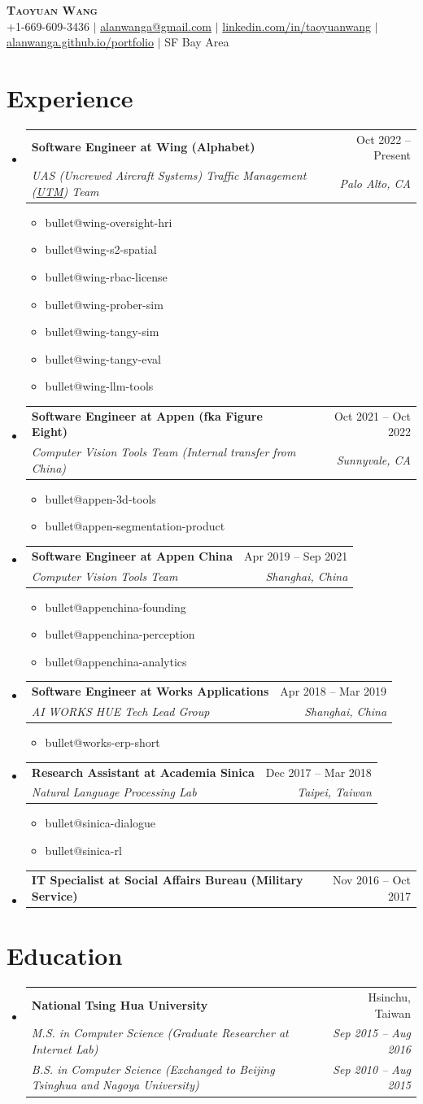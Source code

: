 \documentclass[letterpaper,11pt]{article}
\makeatletter
\newcommand{\resumeItem}[1]{\item\small{{#1 \vspace{-2pt}}}}
\newcommand{\resumeSubheading}[4]{
  \vspace{-2pt}\item
    \begin{tabular*}{\linewidth}[t]{l@{\extracolsep{\fill}}r}
      \textbf{#1} & #2 \\
      \textit{\small#3} & \textit{\small #4} \\
    \end{tabular*}\vspace{-7pt}
}
\newcommand{\resumeSingleHeading}[2]{
  \vspace{-2pt}\item
    \begin{tabular*}{\linewidth}[t]{l@{\extracolsep{\fill}}r}
      \textbf{#1} & #2 \\
    \end{tabular*}\vspace{-7pt}
}
\newcommand{\resumeEducation}[6]{
  \vspace{-2pt}\item
    \begin{tabular*}{\linewidth}[t]{l@{\extracolsep{\fill}}r}
      \textbf{#1} & #2 \\
      \textit{\small#3} & \textit{\small #4} \\
      \textit{\small#5} & \textit{\small #6} \\
    \end{tabular*}\vspace{-7pt}
}
\newcommand{\resumeSubHeadingListStart}{\begin{itemize}[leftmargin=0.15in, label={}]}
\newcommand{\resumeSubHeadingListEnd}{\end{itemize}}
\newcommand{\resumeItemListStart}{\begin{itemize}}
\newcommand{\resumeItemListEnd}{\end{itemize}\vspace{-5pt}}
\newcommand{\usebullet}[1]{\resumeItem{\csname bullet@#1\endcsname}}
\makeatother
\begin{document}
\begin{center}
    \textbf{\Huge \scshape Taoyuan Wang} \\ \vspace{1pt}
    \small +1-669-609-3436 $|$ \href{mailto:alanwanga@gmail.com}{alanwanga@gmail.com} $|$
    \href{https://www.linkedin.com/in/taoyuanwang}{linkedin.com/in/taoyuanwang} $|$
    \href{https://alanwanga.github.io/portfolio/}{alanwanga.github.io/portfolio} $|$ SF Bay Area
\end{center}
\section{Experience}
  \resumeSubHeadingListStart
    \resumeSubheading{Software Engineer at Wing (Alphabet)}{Oct 2022 -- Present}{UAS (Uncrewed Aircraft Systems) Traffic Management (\href{https://www.nasa.gov/utm}{UTM}) Team}{Palo Alto, CA}
      \resumeItemListStart
        \usebullet{wing-oversight-hri}
        \usebullet{wing-s2-spatial}
        \usebullet{wing-rbac-license}
        \usebullet{wing-prober-sim}
        \usebullet{wing-tangy-sim}
        \usebullet{wing-tangy-eval}
        \usebullet{wing-llm-tools}
      \resumeItemListEnd
    \resumeSubheading{Software Engineer at Appen (fka Figure Eight)}{Oct 2021 -- Oct 2022}{Computer Vision Tools Team (Internal transfer from China)}{Sunnyvale, CA}
      \resumeItemListStart
        \usebullet{appen-3d-tools}
        \usebullet{appen-segmentation-product}
      \resumeItemListEnd
    \resumeSubheading{Software Engineer at Appen China}{Apr 2019 -- Sep 2021}{Computer Vision Tools Team}{Shanghai, China}
      \resumeItemListStart
        \usebullet{appenchina-founding}
        \usebullet{appenchina-perception}
        \usebullet{appenchina-analytics}
      \resumeItemListEnd
    \resumeSubheading{Software Engineer at Works Applications}{Apr 2018 -- Mar 2019}{AI WORKS HUE Tech Lead Group}{Shanghai, China}
      \resumeItemListStart
        \usebullet{works-erp-short}
      \resumeItemListEnd
    \resumeSubheading{Research Assistant at Academia Sinica}{Dec 2017 -- Mar 2018}{Natural Language Processing Lab}{Taipei, Taiwan}
      \resumeItemListStart
        \usebullet{sinica-dialogue}
        \usebullet{sinica-rl}
      \resumeItemListEnd
    \resumeSingleHeading{IT Specialist at Social Affairs Bureau (Military Service)}{Nov 2016 -- Oct 2017}
  \resumeSubHeadingListEnd
\section{Education}
  \resumeSubHeadingListStart
    \resumeEducation{National Tsing Hua University}{Hsinchu, Taiwan}
      {M.S. in Computer Science (Graduate Researcher at Internet Lab)}{Sep 2015 -- Aug 2016}
      {B.S. in Computer Science (Exchanged to Beijing Tsinghua and Nagoya University)}{Sep 2010 -- Aug 2015}
  \resumeSubHeadingListEnd
\end{document}
